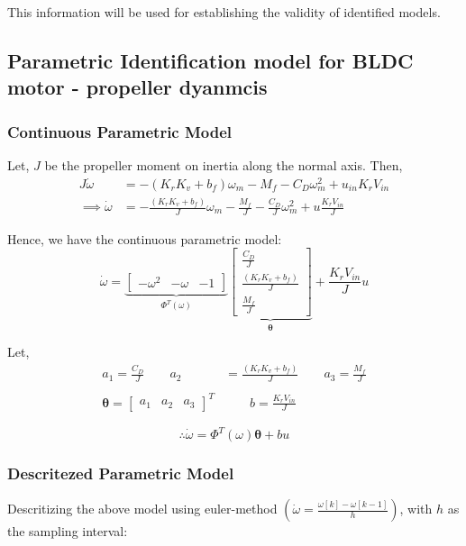 This information will be used for establishing the validity of identified models.

\subsection{Parametric Identification model for BLDC motor - propeller dyanmcis}
\subsubsection{Continuous Parametric Model}
Let, $J$ be the propeller moment on inertia along the normal axis. Then,
\begin{align*}
    J \dot \omega &= -(K_rK_v + b_f) \omega_m - M_f - C_D \omega_m^2 + u_{in} K_r V_{in}\\
    \implies \dot \omega &= -\frac{(K_rK_v + b_f)}{J} \omega_m - \frac{M_f}{J} - \frac{C_D}{J} \omega_m^2 + u \frac{K_r V_{in}}{J}
\end{align*}

Hence, we have the continuous parametric model:
$$ \dot \omega =
    \underbrace{\begin{bmatrix}
    - \omega^2 & - \omega  & -1
\end{bmatrix}}_{\Phi^T(\omega)}
\underbrace{\begin{bmatrix}
    \frac{C_{D}}{J} \\
    \frac{(K_rK_v + b_f)}{J}  \\
    \frac{M_f}{J}
\end{bmatrix} }_{\pmb \theta}
    +\frac{K_r V_{in}}{J}u $$

Let,
\begin{align*}
    a_1 = \frac{C_{D}}{J}  \qquad
    a_2 &= \frac{(K_rK_v + b_f)}{J} \qquad
    a_3 =   \frac{M_f}{J}\\
    \\
    \pmb \theta = \begin{bmatrix}a_1 & a_2 & a_3 \end{bmatrix}^T &\qquad
    b =  \frac{K_r V_{in}}{J}
\end{align*}

$$\therefore \dot \omega = \Phi^T(\omega) \pmb \theta + b u$$

\subsubsection{Descritezed Parametric Model}
Descritizing the above model using euler-method $\left(\dot \omega = \frac{\omega[k] - \omega[k-1]}{h}\right)$, with $h$ as the sampling interval:

